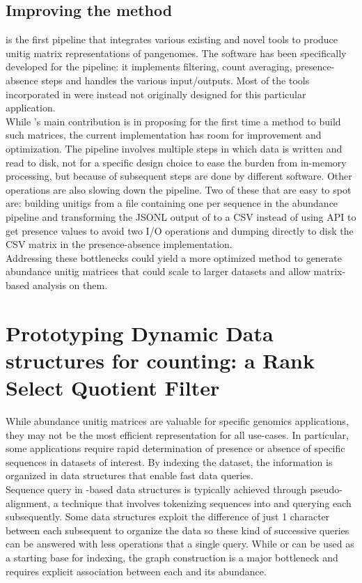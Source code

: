 \subsection{Improving the method}
\muset is the first pipeline that integrates various existing and novel tools to produce unitig matrix representations of pangenomes. The \kmat software has been specifically developed for the pipeline: it implements filtering, count averaging, presence-absence steps and handles the various input/outputs. Most of the tools incorporated in \muset were instead not originally designed for this particular application.\\
While \muset's main contribution is in proposing for the first time a method to build such matrices, the current implementation has room for improvement and optimization.
The pipeline involves multiple steps in which data is written and read to disk, not for a specific design choice to ease the burden from in-memory processing, but because of subsequent steps are done by different software. Other operations are also slowing down the pipeline. Two of these that are easy to spot are: building unitigs from a file containing one \kmer per sequence in the abundance pipeline and transforming the \gls{JSONL} output of \ggcat to a \gls{CSV} instead of using \ggcat \gls{API} to get presence values to avoid two \gls{I/O} operations and dumping directly to disk the CSV matrix in the presence-absence implementation.\\
Addressing these bottlenecks could yield a more optimized method to generate abundance unitig matrices that could scale to larger datasets and allow matrix-based analysis on them.

\clearpage

\section{Prototyping Dynamic Data structures for \kmer counting: a Rank Select Quotient Filter}
\label{sec:qf}
While abundance unitig matrices are valuable for specific genomics applications, they may not be the most efficient representation for all use-cases. In particular, some applications require rapid determination of presence or absence of specific sequences in datasets of interest. By indexing the dataset, the information is organized in data structures that enable fast data queries.\\
Sequence query in \kmer-based data structures is typically achieved through pseudo-alignment, a technique that involves tokenizing sequences into \kmers and querying each \kmer subsequently. Some data structures exploit the difference of just 1 character between each subsequent \kmer to organize the data so these kind of successive queries can be answered with less operations that a single \kmer query. While \cdbg or \ccdbg can be used as a starting base for indexing, the graph construction is a major bottleneck and requires explicit association between each \kmer and its abundance. \\

